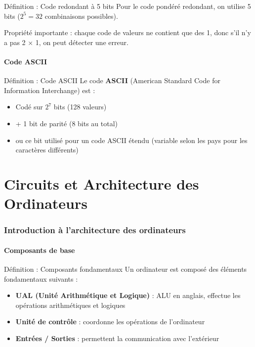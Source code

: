 \documentclass[a4paper,12pt]{article}
\begin{document}
\begin{defbox}{Définition : Code redondant à 5 bits}
Pour le code pondéré redondant, on utilise 5 bits ($2^5 = 32$ combinaisons possibles).

Propriété importante : chaque code de valeurs ne contient que des 1, donc s'il n'y a pas 2 × 1, on peut détecter une erreur.
\end{defbox}

\subsection{Code ASCII}

\begin{defbox}{Définition : Code ASCII}
Le code \textbf{ASCII} (American Standard Code for Information Interchange) est :
\begin{itemize}
    \item Codé sur $2^7$ bits (128 valeurs)
    \item + 1 bit de parité (8 bits au total)
    \item ou ce bit utilisé pour un code ASCII étendu (variable selon les pays pour les caractères différents)
\end{itemize}
\end{defbox}

\newpage


\part{Circuits et Architecture des Ordinateurs}

\section{Introduction à l'architecture des ordinateurs}

\subsection{Composants de base}

\begin{defbox}{Définition : Composants fondamentaux}
Un ordinateur est composé des éléments fondamentaux suivants :

\begin{itemize}
    \item \textbf{UAL (Unité Arithmétique et Logique)} : ALU en anglais, effectue les opérations arithmétiques et logiques
    \item \textbf{Unité de contrôle} : coordonne les opérations de l'ordinateur
    \item \textbf{Entrées / Sorties} : permettent la communication avec l'extérieur
\end{itemize}
\end{defbox}
\end{document}
